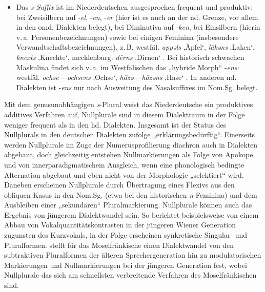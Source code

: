 \begin{itemize}
\item Das \textit{\textit{s}}\textit{{}-Suffix} ist im Niederdeutschen ausgesprochen frequent und produktiv: bei Zweisilbern auf -\textit{el}, -\textit{en}, -\textit{er} (hier ist es auch an der nd. Grenze, vor allem in den omd. Dialekten belegt), bei Diminutiva auf -\textit{ken}, bei Einsilbern (hierin v.\,a. Personenbezeichnungen) sowie bei einigen Feminina (insbesondere Verwandtschaftsbezeichnungen), z.\,B. westfäl. \textit{appəls} ‚Äpfel‘, \textit{lākəns} ‚Laken‘, \textit{knexts} ‚Knechte‘, mecklenburg. \textit{dērns} ‚Dirnen‘ \citep[423--424]{Schirmunski1962}. Bei historisch schwachen Maskulina findet sich v.\,a. im Westfälischen das „hybride Morph“ \citep[1200]{Dingeldein1983} -\textit{ens}: westfäl. \textit{ochse} -- \textit{ochsens} ‚Ochse‘, \textit{hāzə} -- \textit{hāzəns} ‚Hase‘ \citep[424]{Schirmunski1962}. In anderen nd. Dialekten ist -\textit{ens} nur nach Ausweitung des Nasalsuffixes im Nom.Sg. belegt.
\end{itemize}

Mit dem genusunabhängigen \textit{s}{}-Plural weist das Niederdeutsche ein produktives additives Verfahren auf, Nullplurale sind in diesem Dialektraum in der Folge weniger frequent als in den hd. Dialekten. Insgesamt ist der Status des Nullplurals in den deutschen Dialekten \citet[64]{Nübling2005} zufolge „erklärungsbedürftig“. Einerseits werden Nullplurale im Zuge der Numerusprofilierung diachron auch in Dialekten abgebaut, doch gleichzeitig entstehen Nullmarkierungen als Folge von Apokope und von innerparadigmatischem Ausgleich, wenn eine phonologisch bedingte Alternation abgebaut und eben nicht von der Morphologie „selektiert“ wird. Daneben erscheinen Nullplurale durch Übertragung eines Flexivs aus den obliquen Kasus in den Nom.Sg. (etwa bei den historischen \textit{n}{}-Feminina) und dem Ausbleiben einer „sekundären“ Pluralmarkierung. Nullplurale können auch das Ergebnis von jüngerem Dialektwandel sein. So berichtet beispielsweise \citet[§34k8]{Kranzmayer1956} von einem Abbau von Vokalquantitätskontrasten in der jüngeren Wiener Generation zugunsten des Kurzvokals, in der Folge erscheinen synkretische Singular- und Pluralformen. \citet{Girnth2006} stellt für das Moselfränkische einen Dialektwandel von den subtraktiven Pluralformen der älteren Sprechergeneration hin zu modulatorischen Markierungen und Nullmarkierungen bei der jüngeren Generation fest, wobei Nullplurale das sich am schnellsten verbreitende Verfahren des Moselfränkischen sind.

